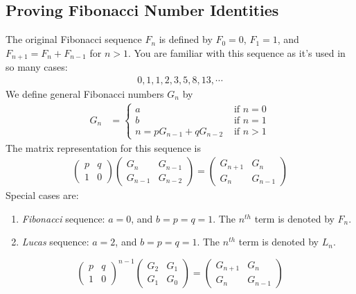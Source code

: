 \subsection{Proving Fibonacci Number Identities}
The original Fibonacci sequence $F_n$ is defined by $F_0=0$, $F_1=1$, and $F_{n+1} = F_{n}+F_{n-1}$ for $n>1$. You are familiar with this sequence as it's used in so many cases:
\begin{align*}
0,1,1,2,3,5,8,13,\cdots
\end{align*}
We define general Fibonacci numbers $G_n$ by
\begin{align*}
	G_{n}
		& =
			\begin{cases}
				a& \mbox{ if }n=0\\
				b& \mbox{ if }n=1\\
				n=pG_{n-1}+qG_{n-2}& \mbox{ if }n>1
			\end{cases}
\end{align*}
The matrix representation for this sequence is
\begin{align*}
\begin{pmatrix}
p & q\\
1 & 0
\end{pmatrix}
\begin{pmatrix}
G_n & G_{n-1}\\
G_{n-1} & G_{n-2}
\end{pmatrix}=
\begin{pmatrix}
G_{n+1} & G_n\\
G_n & G_{n-1}
\end{pmatrix}
\end{align*}
Special cases are:
\begin{enumerate}
\item \textit{Fibonacci} sequence: $a=0$, and $b=p=q=1$. The $n^{th}$ term is denoted by $F_n$.
\item \textit{Lucas} sequence: $a=2$, and $b=p=q=1$. The $n^{th}$ term is denoted by $L_n$.
\end{enumerate}

\begin{theorem}
\begin{equation}
\begin{pmatrix}
p & q\\
1 & 0
\end{pmatrix}^{n-1}
\begin{pmatrix}
G_2 & G_1\\
G_1 & G_0
\end{pmatrix}=
\begin{pmatrix}
G_{n+1} & G_n\\
G_n & G_{n-1}
\end{pmatrix}\label{eqn:generalfibo}
\end{equation}
\end{theorem}

